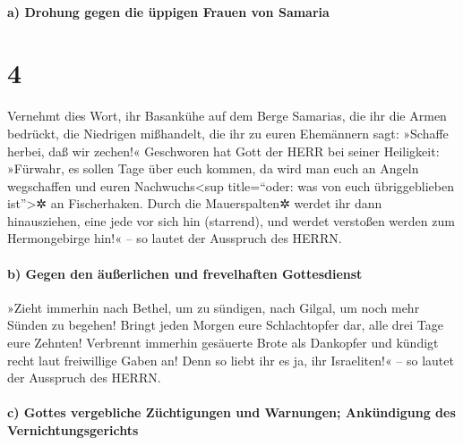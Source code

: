 \hypertarget{a-drohung-gegen-die-uxfcppigen-frauen-von-samaria}{%
\paragraph{a) Drohung gegen die üppigen Frauen von
Samaria}\label{a-drohung-gegen-die-uxfcppigen-frauen-von-samaria}}

\hypertarget{section-3}{%
\section{4}\label{section-3}}

Vernehmt dies Wort, ihr Basankühe auf dem Berge Samarias,
die ihr die Armen bedrückt, die Niedrigen mißhandelt, die ihr zu euren
Ehemännern sagt: »Schaffe herbei, daß wir zechen!«
Geschworen hat Gott der HERR bei seiner Heiligkeit:
»Fürwahr, es sollen Tage über euch kommen, da wird man euch an Angeln
wegschaffen und euren Nachwuchs\textless sup title=``oder: was von euch
übriggeblieben ist''\textgreater✲ an Fischerhaken. Durch
die Mauerspalten✲ werdet ihr dann hinausziehen, eine jede vor sich hin
(starrend), und werdet verstoßen werden zum Hermongebirge hin!« -- so
lautet der Ausspruch des HERRN.

\hypertarget{b-gegen-den-uxe4uuxdferlichen-und-frevelhaften-gottesdienst}{%
\paragraph{b) Gegen den äußerlichen und frevelhaften
Gottesdienst}\label{b-gegen-den-uxe4uuxdferlichen-und-frevelhaften-gottesdienst}}

»Zieht immerhin nach Bethel, um zu sündigen, nach Gilgal,
um noch mehr Sünden zu begehen! Bringt jeden Morgen eure Schlachtopfer
dar, alle drei Tage eure Zehnten! Verbrennt immerhin
gesäuerte Brote als Dankopfer und kündigt recht laut freiwillige Gaben
an! Denn so liebt ihr es ja, ihr Israeliten!« -- so lautet der Ausspruch
des HERRN.

\hypertarget{c-gottes-vergebliche-zuxfcchtigungen-und-warnungen-ankuxfcndigung-des-vernichtungsgerichts}{%
\paragraph{c) Gottes vergebliche Züchtigungen und Warnungen; Ankündigung
des
Vernichtungsgerichts}\label{c-gottes-vergebliche-zuxfcchtigungen-und-warnungen-ankuxfcndigung-des-vernichtungsgerichts}}

